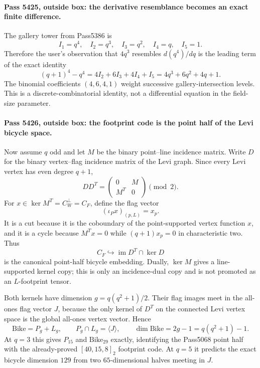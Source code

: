 \paragraph{Pass 5425, outside box: the derivative resemblance becomes an exact finite difference.}
The gallery tower from Pass5386 is
\[
 I_1=q^4,\quad I_2=q^3,\quad I_3=q^2,\quad I_4=q,\quad I_5=1.
\]
Therefore the user's observation that $4q^3$ resembles $d(q^4)/dq$ is the leading term of the exact identity
\[
 \boxed{(q+1)^4-q^4=4I_2+6I_3+4I_4+I_5}
 =4q^3+6q^2+4q+1.
\]
The binomial coefficients $(4,6,4,1)$ weight successive gallery-intersection levels.  This is a discrete-combinatorial identity, not a differential equation in the field-size parameter.

\paragraph{Pass 5426, outside box: the footprint code is the point half of the Levi bicycle space.}
Now assume $q$ odd and let $M$ be the binary point--line incidence matrix.  Write $D$ for the binary vertex--flag incidence matrix of the Levi graph.  Since every Levi vertex has even degree $q+1$,
\[
 DD^T=\begin{pmatrix}0&M\\M^T&0\end{pmatrix}\pmod2.
\]
For $x\in\ker M^T=C_W^\perp=C_F$, define the flag vector
\[
 (\iota_Px)_{(p,L)}=x_p.
\]
It is a cut because it is the coboundary of the point-supported vertex function $x$, and it is a cycle because $M^Tx=0$ while $(q+1)x_p=0$ in characteristic two.  Thus
\[
 \boxed{C_F\hookrightarrow \operatorname{im}D^T\cap\ker D}
\]
is the canonical point-half bicycle embedding.  Dually, $\ker M$ gives a line-supported kernel copy; this is only an incidence-dual copy and is not promoted as an $L$-footprint tensor.

Both kernels have dimension $g=q(q^2+1)/2$.  Their flag images meet in the all-ones flag vector $J$, because the only kernel of $D^T$ on the connected Levi vertex space is the global all-ones vertex vector.  Hence
\[
 \boxed{\mathrm{Bike}=P_g+L_g,\qquad P_g\cap L_g=\langle J\rangle,\qquad
 \dim\mathrm{Bike}=2g-1=q(q^2+1)-1}.
\]
At $q=3$ this gives $P_{15}$ and $\mathrm{Bike}_{29}$ exactly, identifying the Pass5068 point half with the already-proved $[40,15,8]_2$ footprint code.  At $q=5$ it predicts the exact bicycle dimension $129$ from two $65$-dimensional halves meeting in $J$.

